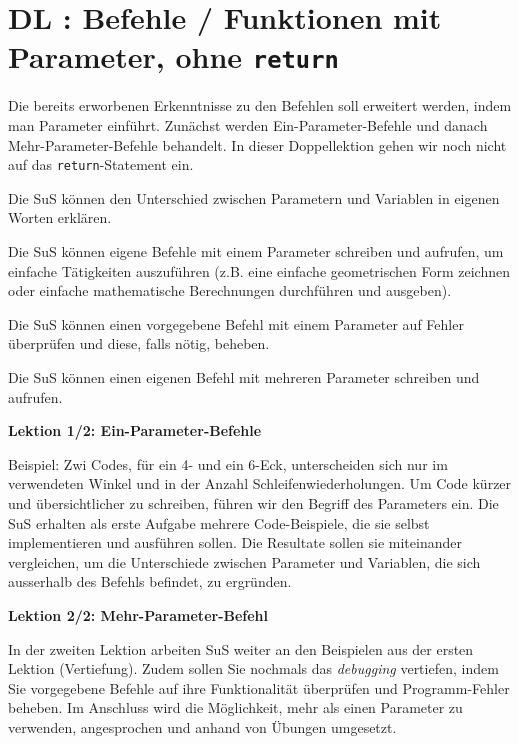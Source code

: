 \section{DL \themycounter: Befehle / Funktionen mit Parameter, ohne \texorpdfstring{\lstinline|return|}{return}}
\begin{myExBox}[title=DL \themycounter]
Die bereits erworbenen Erkenntnisse zu den Befehlen soll erweitert werden, indem man Parameter einführt. Zunächst werden Ein-Parameter-Befehle und danach Mehr-Parameter-Befehle behandelt. In dieser Doppellektion gehen wir noch nicht auf das \lstinline|return|-Statement ein. 


\begin{todolist}
    \item Die SuS können den Unterschied zwischen Parametern und Variablen in eigenen Worten erklären.
    \item Die SuS können eigene Befehle mit einem Parameter schreiben und aufrufen, um einfache Tätigkeiten auszuführen (z.B. eine einfache geometrischen Form zeichnen oder einfache mathematische Berechnungen durchführen und ausgeben).
    \item Die SuS können einen vorgegebene Befehl mit einem Parameter auf Fehler überprüfen und diese, falls nötig, beheben. 
    \item Die SuS können einen eigenen Befehl mit mehreren Parameter schreiben und aufrufen.
\end{todolist}

\textbf{Lektion 1/2: Ein-Parameter-Befehle}

Beispiel: Zwi Codes, für ein 4- und ein 6-Eck, unterscheiden sich nur im verwendeten Winkel und in der Anzahl Schleifenwiederholungen. Um Code kürzer und übersichtlicher zu schreiben, führen wir den Begriff des Parameters ein. Die SuS erhalten als erste Aufgabe mehrere Code-Beispiele, die sie selbst implementieren und ausführen sollen. Die Resultate sollen sie miteinander vergleichen, um die Unterschiede zwischen Parameter und Variablen, die sich ausserhalb des Befehls befindet, zu ergründen.

\textbf{Lektion 2/2: Mehr-Parameter-Befehl}

In der zweiten Lektion arbeiten SuS weiter an den Beispielen aus der ersten Lektion (Vertiefung). Zudem sollen Sie nochmals das \textit{debugging} vertiefen, indem Sie vorgegebene Befehle auf ihre Funktionalität überprüfen und Programm-Fehler beheben. Im Anschluss wird die Möglichkeit, mehr als einen Parameter zu verwenden, angesprochen und anhand von Übungen umgesetzt.


\end{myExBox}
